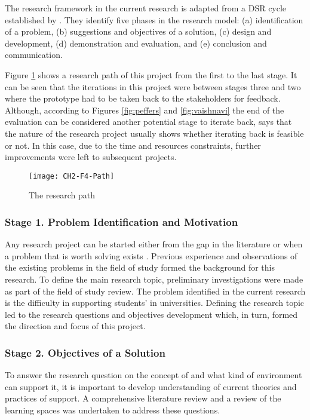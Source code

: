 The research framework in the current research is adapted from a DSR cycle
established by \citet{Vaishnavi2007}. They identify five phases in the research
model: (a) identification of a problem, (b) suggestions and objectives of a
solution, (c) design and development, (d) demonstration and evaluation, and (e)
conclusion and communication.

Figure \ref{fig:path} shows a research path of this project from the first
to the last stage. It can be seen that the iterations in this project were
between stages three and two where the prototype had to be taken back to the
stakeholders for feedback. Although, according to Figures \ref{fig:peffers} and
\ref{fig:vaishnavi} the end of the evaluation can be considered another
potential stage to iterate back, \citet{Peffers2008} says that the nature of the
research project usually shows whether iterating back is feasible or not. In
this case, due to the time and resources constraints, further improvements were
left to subsequent projects.

\begin{figure}[htb]
\centering
\texttt{[image: CH2-F4-Path]}
\caption{The research path}
\label{fig:path}
\end{figure}

\subsubsection{Stage 1. Problem Identification and Motivation}

Any research project can be started either from the gap in the literature or
when a problem that is worth solving exists \citep{Bourner2002}. Previous
experience and observations of the existing problems in the field of study
formed the background for this research. To define the main research topic,
preliminary investigations were made as part of the field of study review. The
problem identified in the current research is the difficulty in supporting
students' \LLLs in universities. Defining the research topic led to the research
questions and objectives development which, in turn, formed the direction and
focus of this project.

\subsubsection{Stage 2. Objectives of a Solution}

To answer the research question on the concept of \LLLs and what kind of
environment can support it, it is important to develop understanding of
current theories and practices of \LLLs support. A comprehensive literature
review and a review of the learning spaces was undertaken to address these
questions.

